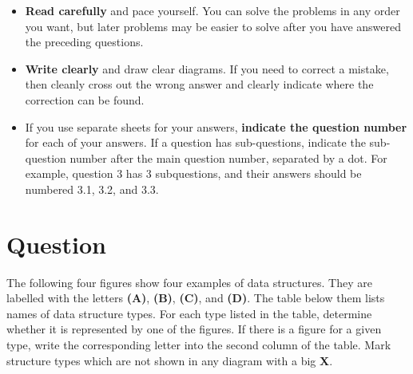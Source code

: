 \documentclass[a4paper]{article}
\newcounter{question}
\newcommand{\question}{\refstepcounter{question}\section*{Question~\thequestion}}
\renewcommand*\thequestion{\arabic{question}}
\begin{document}
\begin{itemize}
\item
  \textbf{Read carefully} and pace yourself.
  You can solve the problems in any order you want, but later problems may be easier to solve after you have answered the preceding questions.
\item
  \textbf{Write clearly} and draw clear diagrams.
  If you need to correct a mistake, then cleanly cross out the wrong answer and clearly indicate where the correction can be found.
\item
  If you use separate sheets for your answers, \textbf{indicate the question number} for each of your answers.
  If a question has sub-questions, indicate the sub-question number after the main question number, separated by a dot.
  For example, question 3 has 3 subquestions, and their answers should be numbered 3.1, 3.2, and 3.3.
\end{itemize}



\pagebreak
\pagestyle{plain}
\thispagestyle{plain}
\setcounter{page}{1}



\question\label{q:container-structures-a}

The following four figures show four examples of data structures.
They are labelled with the letters \textbf{(A)}, \textbf{(B)}, \textbf{(C)}, and \textbf{(D)}.
The table below them lists names of data structure types.
For each type listed in the table, determine whether it is represented by one of the figures.
If there is a figure for a given type, write the corresponding letter into the second column of the table.
Mark structure types which are not shown in any diagram with a big \textbf{X}.\\[\baselineskip]

\noindent
\begin{minipage}[b]{0.44\columnwidth}
\end{minipage}
\hfill
\begin{minipage}[b]{0.5\columnwidth}
\end{minipage}
\end{document}
